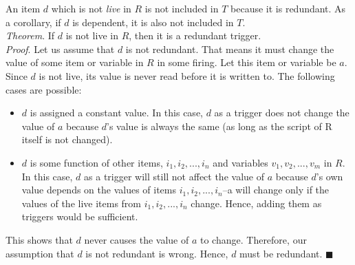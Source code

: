 \documentclass{sig-alternate-05-2015}
\begin{document}
\begin{enumerate}
An item $d$ which is not \textit{live} in $R$ is not included in $T$ because it is redundant. As a corollary, if $d$ is dependent, it is also not included in $T$.\\
\emph{Theorem}. If $d$ is not live in $R$, then it is a redundant trigger.\\
\emph{Proof}. Let us assume that $d$ is not redundant. That means it must change the value of some item or variable in $R$ in some firing. Let this item or variable be $a$. Since $d$ is not live, its value is never read before it is written to. The following cases are possible:
\begin{itemize} [topsep=-2pt, itemsep=-1pt]
\item $d$ is assigned a constant value. In this case, $d$ as a trigger does not change the value of $a$ because $d$'s value is always the same (as long as the script of R  itself is not changed).
\item $d$ is some function of other items, $i_1, i_2, ..., i_n$ and variables $v_1, v_2, ..., v_m$ in $R$. In this case, $d$ as a trigger will still not affect the value of $a$ because $d$'s own value depends on the values of items $i_1, i_2, ..., i_n$--a will change only if the values of the live items from $i_1, i_2, ..., i_n$ change. Hence, adding them as triggers would be sufficient.
\end{itemize}
This shows that $d$ never causes the value of $a$ to change. Therefore, our assumption that $d$ is not redundant is wrong. Hence, $d$ must be redundant. $\blacksquare$
\end{enumerate}
\end{document}
